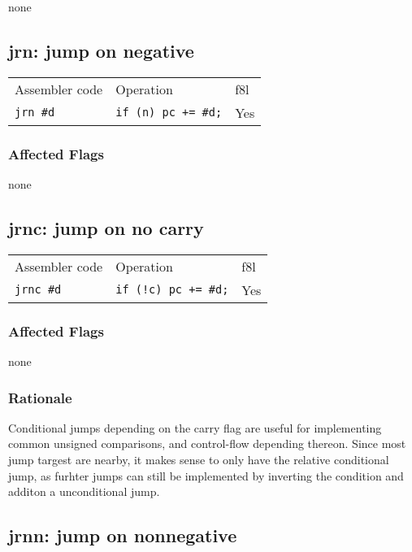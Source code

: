 \documentclass{book}
\begin{document}
none


\subsection{jrn: jump on negative}

\begin{tabular}{l l l}
Assembler code   & Operation                  & f8l \\
\texttt{jrn \#d} & \texttt{if (n) pc += \#d;} & Yes \\
\end{tabular}

\subsubsection*{Affected Flags}

none


\subsection{jrnc: jump on no carry}

\begin{tabular}{l l l}
Assembler code    & Operation                    & f8l \\
\texttt{jrnc \#d} & \texttt{if (!c) pc += \#d;} & Yes \\
\end{tabular}

\subsubsection*{Affected Flags}

none

\subsubsection*{Rationale}

Conditional jumps depending on the carry flag are useful for implementing common unsigned comparisons, and control-flow depending thereon. Since most jump targest are nearby, it makes sense to only have the relative conditional jump, as furhter jumps can still be implemented by inverting the condition and additon a unconditional jump.


\subsection{jrnn: jump on nonnegative}
\end{document}
